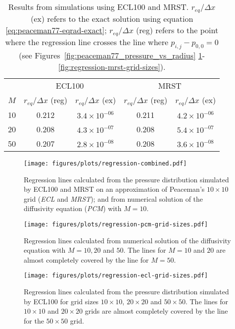 \begin{table}[htbp]
\centering
    \caption{Results from simulations using ECL100 and MRST. $r_{eq}/\Delta x$ (ex) refers to the exact solution using equation \eqref{eq:peaceman77-eqrad-exact}; $r_{eq} / \Delta x$ (reg) refers to the point where the regression line crosses the line where $p_{i,j}-p_{0,0}=0$ (see Figures~\ref{fig:peaceman77_pressure_vs_radius} \ref{fig:regression-combined}-\ref{fig:regression-mrst-grid-sizes}).}
    \begin{tabular}{c|cc|cc}
        \toprule
            & \multicolumn{2}{c|}{ECL100} & \multicolumn{2}{c}{MRST} \\
        $M$ &  $r_{eq}/\Delta x$ (reg) & $r_{eq}/\Delta x$ (ex) & $r_{eq}/\Delta x$ (reg) & $r_{eq}/\Delta x$ (ex) \\
        \midrule
        10  & 0.212 & $3.4\times 10^{-06}$  &  0.211 & $4.2\times 10^{-06}$ \\
        20  & 0.208 & $4.3\times 10^{-07}$  &  0.208 & $5.4\times 10^{-07}$ \\
        50  & 0.207 & $2.8\times 10^{-08}$  &  0.208 & $3.6\times 10^{-08}$ \\
        \bottomrule
    \end{tabular}
    \label{tbl:simulation-results}
\end{table}




\begin{figure}[htbp]
    \centering
    \texttt{[image: figures/plots/regression-combined.pdf]}
    \caption{Regression lines calculated from the pressure distribution simulated by ECL100 and MRST on an approximation of Peaceman's $10\times 10$ grid (\emph{ECL} and \emph{MRST}); and from numerical solution of the diffusivity equation (\emph{PCM}) with $M=10$.}
    \label{fig:regression-combined}
\end{figure}

\begin{figure}[htbp]
    \centering
    \texttt{[image: figures/plots/regression-pcm-grid-sizes.pdf]}
    \caption{Regression lines calculated from numerical solution of the diffusivity equation with $M=10,20$ and $50$. The lines for $M=10$ and $20$ are almost completely covered by the line for $M=50$.}
    \label{fig:regression-pcm-grid-sizes}
\end{figure}

\begin{figure}[htbp]
    \centering
    \texttt{[image: figures/plots/regression-ecl-grid-sizes.pdf]}
    \caption{Regression lines calculated from the pressure distribution simulated by ECL100 for grid sizes $10\times 10$, $20\times 20$ and $50\times 50$. The lines for $10\times 10$ and $20\times 20$ grids are almost completely covered by the line for the $50 \times 50$ grid.}
    \label{fig:regression-ecl-grid-sizes}
\end{figure}

